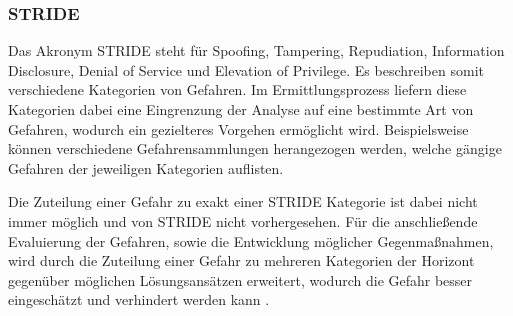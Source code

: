 \subsubsection{STRIDE}\label{sec:stride}
Das Akronym STRIDE steht für Spoofing, Tampering, Repudiation, Information Disclosure, Denial of Service und Elevation of Privilege.
Es beschreiben somit verschiedene Kategorien von Gefahren.
Im Ermittlungsprozess liefern diese Kategorien dabei eine Eingrenzung der Analyse auf eine bestimmte Art von Gefahren, wodurch ein gezielteres Vorgehen ermöglicht wird.
Beispielsweise können verschiedene Gefahrensammlungen herangezogen werden, welche gängige Gefahren der jeweiligen Kategorien auflisten.

Die Zuteilung einer Gefahr zu exakt einer STRIDE Kategorie ist dabei nicht immer möglich und von STRIDE nicht vorhergesehen.
Für die anschließende Evaluierung der Gefahren, sowie die Entwicklung möglicher Gegenmaßnahmen, wird durch die Zuteilung einer Gefahr zu mehreren Kategorien der Horizont gegenüber möglichen Lösungsansätzen erweitert, wodurch die Gefahr besser eingeschätzt und verhindert werden kann \autocite[vgl.][S. 61-64]{shostack_threat_2014}.




